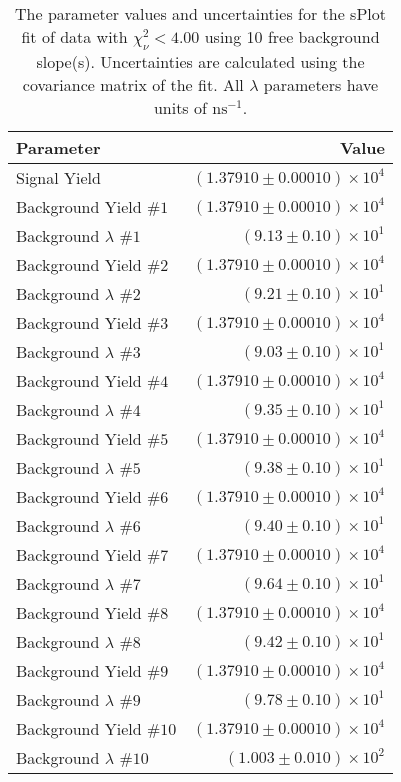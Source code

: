 
\begin{table}
    \begin{center}
        \begin{tabular}{lr}\toprule
            Parameter & Value \\\midrule
            Signal Yield & $(1.37910 \pm 0.00010) \times 10^{4}$ \\
            Background Yield $\#1$ & $(1.37910 \pm 0.00010) \times 10^{4}$ \\
            Background $\lambda$ $\#1$ & $(9.13 \pm 0.10) \times 10^{1}$ \\
            Background Yield $\#2$ & $(1.37910 \pm 0.00010) \times 10^{4}$ \\
            Background $\lambda$ $\#2$ & $(9.21 \pm 0.10) \times 10^{1}$ \\
            Background Yield $\#3$ & $(1.37910 \pm 0.00010) \times 10^{4}$ \\
            Background $\lambda$ $\#3$ & $(9.03 \pm 0.10) \times 10^{1}$ \\
            Background Yield $\#4$ & $(1.37910 \pm 0.00010) \times 10^{4}$ \\
            Background $\lambda$ $\#4$ & $(9.35 \pm 0.10) \times 10^{1}$ \\
            Background Yield $\#5$ & $(1.37910 \pm 0.00010) \times 10^{4}$ \\
            Background $\lambda$ $\#5$ & $(9.38 \pm 0.10) \times 10^{1}$ \\
            Background Yield $\#6$ & $(1.37910 \pm 0.00010) \times 10^{4}$ \\
            Background $\lambda$ $\#6$ & $(9.40 \pm 0.10) \times 10^{1}$ \\
            Background Yield $\#7$ & $(1.37910 \pm 0.00010) \times 10^{4}$ \\
            Background $\lambda$ $\#7$ & $(9.64 \pm 0.10) \times 10^{1}$ \\
            Background Yield $\#8$ & $(1.37910 \pm 0.00010) \times 10^{4}$ \\
            Background $\lambda$ $\#8$ & $(9.42 \pm 0.10) \times 10^{1}$ \\
            Background Yield $\#9$ & $(1.37910 \pm 0.00010) \times 10^{4}$ \\
            Background $\lambda$ $\#9$ & $(9.78 \pm 0.10) \times 10^{1}$ \\
            Background Yield $\#10$ & $(1.37910 \pm 0.00010) \times 10^{4}$ \\
            Background $\lambda$ $\#10$ & $(1.003 \pm 0.010) \times 10^{2}$ \\\bottomrule
        \end{tabular}
        \caption{The parameter values and uncertainties for the sPlot fit of data with $\chi^2_\nu < 4.00$ using 10 free background slope(s). Uncertainties are calculated using the covariance matrix of the fit. All $\lambda$ parameters have units of $\si{\nano\second}^{-1}$.}
    \end{center}
\end{table}
